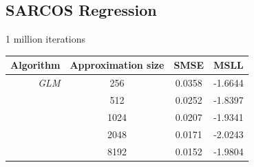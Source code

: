 \documentclass[11pt, oneside]{article}
\begin{document}
\subsection{SARCOS Regression}

1 million iterations

\begin{table}[htb]

    \centering
    \begin{tabular}{r|c|c c}
        \textbf{Algorithm} & \textbf{Approximation size} & \textbf{SMSE} &
        \textbf{MSLL} \\
        \hline
        \emph{GLM} & 256 & 0.0358 & -1.6644 \\
        & 512 & 0.0252 & -1.8397 \\
        & 1024 & 0.0207 & -1.9341 \\
        & 2048 & 0.0171 & -2.0243 \\
        & 8192 & 0.0152 & -1.9804 \\
        \hline
    \end{tabular}

\end{table}


\end{document}

